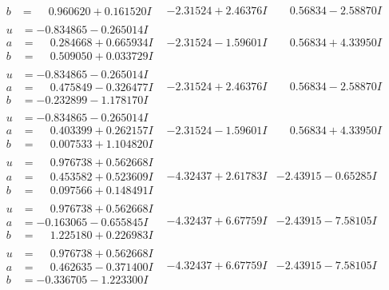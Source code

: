 \documentclass[1p]{elsarticle_modified}
\theoremstyle{definition}
\begin{document}
$$\begin{array}{c|c|c}
\begin{aligned}
b &= \phantom{-}0.960620 + 0.161520 I\end{aligned}
 & -2.31524 + 2.46376 I & \phantom{-}0.56834 - 2.58870 I \\ \hline\begin{aligned}
u &= -0.834865 - 0.265014 I \\
a &= \phantom{-}0.284668 + 0.665934 I \\
b &= \phantom{-}0.509050 + 0.033729 I\end{aligned}
 & -2.31524 - 1.59601 I & \phantom{-}0.56834 + 4.33950 I \\ \hline\begin{aligned}
u &= -0.834865 - 0.265014 I \\
a &= \phantom{-}0.475849 - 0.326477 I \\
b &= -0.232899 - 1.178170 I\end{aligned}
 & -2.31524 + 2.46376 I & \phantom{-}0.56834 - 2.58870 I \\ \hline\begin{aligned}
u &= -0.834865 - 0.265014 I \\
a &= \phantom{-}0.403399 + 0.262157 I \\
b &= \phantom{-}0.007533 + 1.104820 I\end{aligned}
 & -2.31524 - 1.59601 I & \phantom{-}0.56834 + 4.33950 I \\ \hline\begin{aligned}
u &= \phantom{-}0.976738 + 0.562668 I \\
a &= \phantom{-}0.453582 + 0.523609 I \\
b &= \phantom{-}0.097566 + 0.148491 I\end{aligned}
 & -4.32437 + 2.61783 I & -2.43915 - 0.65285 I \\ \hline\begin{aligned}
u &= \phantom{-}0.976738 + 0.562668 I \\
a &= -0.163065 - 0.655845 I \\
b &= \phantom{-}1.225180 + 0.226983 I\end{aligned}
 & -4.32437 + 6.67759 I & -2.43915 - 7.58105 I \\ \hline\begin{aligned}
u &= \phantom{-}0.976738 + 0.562668 I \\
a &= \phantom{-}0.462635 - 0.371400 I \\
b &= -0.336705 - 1.223300 I\end{aligned}
 & -4.32437 + 6.67759 I & -2.43915 - 7.58105 I \\ \hline\begin{aligned}

\end{aligned}
\end{array}$$
\end{document}
